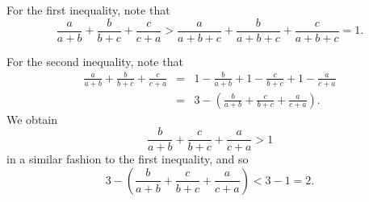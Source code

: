 For the first inequality, note that 
$$\frac{a}{a+b} + \frac{b}{b+c} + \frac{c}{c+a} > \frac{a}{a+b+c} + \frac{b}{a+b+c}+\frac{c}{a+b+c}=1.$$

For the second inequality, note that 
\begin{eqnarray*}
\frac{a}{a+b} + \frac{b}{b+c} + \frac{c}{c+a} &=& 1-\frac{b}{a+b} + 1-\frac{c}{b+c} + 1-\frac{a}{c+a} \\
&=& 3-\left(\frac{b}{a+b} + \frac{c}{b+c} + \frac{a}{c+a}\right).
\end{eqnarray*}
We obtain 
$$\frac{b}{a+b} + \frac{c}{b+c} + \frac{a}{c+a} > 1$$ in a similar fashion to the first inequality, and so 
$$3-\left(\frac{b}{a+b} + \frac{c}{b+c} + \frac{a}{c+a}\right) < 3-1 = 2.$$
